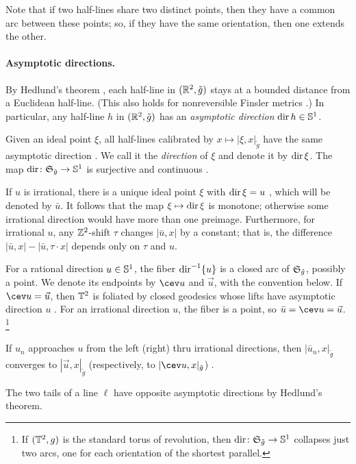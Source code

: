 \documentclass[a4paper,10pt]{article}
\begin{document}
Note that if two half-lines share two distinct points, then they have a common arc between these points; so, if they have the same orientation, then one extends the other.

\paragraph{Asymptotic directions.}
By Hedlund's theorem \cite{hedlund,burago}, each half-line in $(\RR^2,\tilde g)$ stays at a bounded distance from a Euclidean half-line.
(This also holds for nonreversible Finsler metrics \cite[3.1]{schroeder-survey}.)
In particular, any half-line $h$ in $(\RR^2,\tilde g)$ has an \emph{asymptotic direction} $\dir h\in\SSS^1$.

Given an ideal point $\xi$, all half-lines calibrated by $x\mapsto |\xi,x|_{\tilde g}$ have the same asymptotic direction \cite[3.9]{schroeder2017}.
We call it the \emph{direction} of $\xi$ and denote it by $\dir\xi$.
The map $\dir\colon\S_{\tilde g}\to \SSS^1$ is surjective and continuous \cite[3.10]{schroeder2017}.

If $u$ is irrational, there is a unique ideal point $\xi$ with $\dir\xi=u$ \cite[8.7(i)]{schroeder-survey}, which will be denoted by $\bar u$.
It follows that the map $\xi\mapsto\dir\xi$ is monotone; otherwise some irrational direction would have more than one preimage.
Furthermore, for irrational $u$, any $\ZZ^2$-shift $\tau$ changes $|\bar u,x|$ by a constant;
that is, the difference $|\bar u,x|-|\bar u,\tau\cdot x|$ depends only on $\tau$ and $u$.

For a rational direction $u\in\SSS^1$, the fiber $\dir^{-1}\{u\}$ is a closed arc of $\S_{\tilde g}$, possibly a point.
We denote its endpoints by $\cev u$ and $\vec{u}$, with the convention below.
If $\cev u=\vec u$, then $\TT^2$ is foliated by closed geodesics whose lifts have asymptotic direction $u$ \cite[8.7(ii)]{schroeder-survey}.
For an irrational direction $u$, the fiber is a point, so $\bar u=\cev u=\vec{u}$.%
\footnote{If $(\TT^2,g)$ is the standard torus of revolution, then $\dir\colon\S_{\tilde g}\to \SSS^1$ collapses just two arcs, one for each orientation of the shortest parallel.}

If $u_n$ approaches $u$ from the left (right) thru irrational directions, then $|\bar u_n,x|_{\tilde g}$ converges to $|\vec u,x|_{\tilde g}$ (respectively, to $|\cev u,x|_{\tilde g}$) \cite[3.11]{schroeder2017}.

The two tails of a line $\ell$ have opposite asymptotic directions by Hedlund's theorem.
\end{document}
